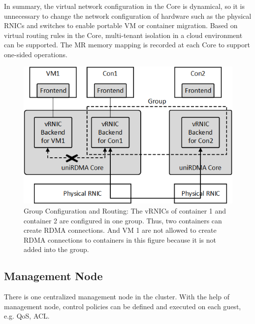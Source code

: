 
In summary, the virtual network configuration in the \sys Core is dynamical, so it is unnecessary to change the network configuration of hardware such as the physical RNICs and switches to enable portable VM or container migration. Based on virtual routing rules in the \sys Core, multi-tenant isolation in a cloud environment can be supported. The MR memory mapping is recorded at each \sys Core to support one-sided operations.

\begin{figure}[!ht]
	\centering
	\includegraphics[width=1.0\linewidth]{images/route-config}
	\caption{Group Configuration and Routing: The vRNICs of container 1 and container 2 are configured in one group. Thus, two containers can create RDMA connections. And VM 1 are not allowed to create RDMA connections to containers in this figure because it is not added into the group. }
	\label{fig:route-config}
\end{figure}

\subsection{Management Node}

There is one centralized management node in the cluster. With the help of management node, control policies can be defined and executed on each guest, e.g. QoS, ACL.


